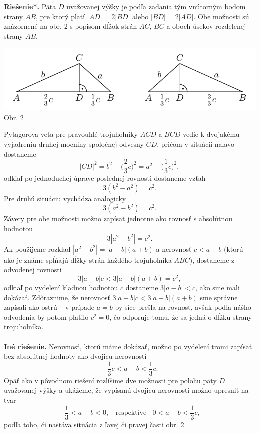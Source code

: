 \documentclass[11pt,a4paper,oneside,final]{book}
\newcommand{\rieh}{\textbf{Riešenie*.} }
\begin{document}
\rieh Päta $D$ uvažovanej výšky je podľa zadania tým vnútorným bodom strany $AB$, pre ktorý platí $|AD| = 2|BD|$ alebo $|BD| = 2|AD|$. Obe možnosti sú znázornené na obr. 2 s popisom dĺžok strán $AC$, $BC$ a oboch úsekov rozdelenej strany $AB$.
\begin{center}
\includegraphics{66D31.pdf}\\

Obr. 2
\end{center}
Pytagorova veta pre pravouhlé trojuholníky $ACD$ a $BCD$ vedie k dvojakému vyjadreniu druhej mocniny spoločnej odvesny $CD$, pričom v situácii naľavo dostaneme
$$|CD|^2= b^2- \bigg(\frac{2}{3}c\bigg)^2= a^2 - \bigg(\frac{1}{3}c\bigg)^2,$$
odkiaľ po jednoduchej úprave poslednej rovnosti dostaneme vzťah
$$3(b^2 - a^2) = c^2.$$
Pre druhú situáciu vychádza analogicky
$$3(a^2 -b^2) = c^2.$$
Závery pre obe možnosti možno zapísať jednotne ako rovnosť s absolútnou hodnotou
$$3|a^2 - b^2 | = c^2.$$
Ak použijeme rozklad $|a^2 - b^2 | = |a - b|(a + b)$ a nerovnosť $c < a + b$ (ktorú ako je známe spĺňajú dĺžky strán každého trojuholníka $ABC$), dostaneme z odvodenej rovnosti
$$3|a - b|c < 3|a - b|(a + b) = c^2,$$
odkiaľ po vydelení kladnou hodnotou $c$ dostaneme $3|a - b| < c$, ako sme mali dokázať. Zdôraznime, že nerovnosť $3|a-b|c < 3|a-b|(a+b)$ sme správne zapísali ako ostrú -- v prípade $a = b$ by síce prešla na rovnosť, avšak podľa nášho odvodenia by potom platilo $c^2 = 0$, čo odporuje tomu, že sa jedná o dĺžku strany trojuholníka.\\
\\
\textbf{Iné riešenie.} Nerovnosť, ktorú máme dokázať, možno po vydelení tromi zapísať bez
absolútnej hodnoty ako dvojicu nerovností
$$-\frac{1}{3}c < a - b < \frac{1}{3}c.$$
Opäť ako v pôvodnom riešení rozlíšime dve možnosti pre polohu päty $D$ uvažovanej výšky a ukážeme, že vypísanú dvojicu nerovností možno upresniť na tvar
$$-\frac{1}{3} < a - b < 0,\ \ \ \ \text{respektíve} \ \ \ \  0 < a - b <\frac{1}{3}c,$$
podľa toho, či nastáva situácia z ľavej či pravej časti obr. 2.
\end{document}
